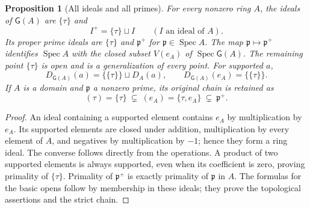 \documentclass[11pt,a4paper]{article}
\newtheorem{proposition}[theorem]{Proposition}
\theoremstyle{definition}\newtheorem{definition}[theorem]{Definition}
\newcommand{\Spec}{\operatorname{Spec}}\newcommand{\SpecMon}{\operatorname{Spec}_{\mathrm{mon}}}
\newcommand{\G}{\mathsf G}\newcommand{\Tor}{\operatorname{Tor}}\newcommand{\Frac}{\operatorname{Frac}}
\begin{document}
\begin{proposition}[All ideals and all primes]\label{prop:ideals}
For every nonzero ring $A$, the ideals of $\G(A)$ are $\{\tau\}$ and
\[
 I^+=\{\tau\}\sqcup I\qquad(I\text{ an ideal of }A).
 \tag{AV3.1}\label{eq:liftideal}
\]
Its proper prime ideals are $\{\tau\}$ and $\mathfrak p^+$ for
$\mathfrak p\in\Spec A$. The map
$\mathfrak p\mapsto\mathfrak p^+$ identifies $\Spec A$ with the closed
subset $V(e_A)$ of $\Spec\G(A)$. The remaining point $\{\tau\}$ is open
and is a generalization of every point. For supported $a$,
\[
 D_{\G(A)}(a)=\{\{\tau\}\}\sqcup D_A(a),\qquad
 D_{\G(A)}(e_A)=\{\{\tau\}\}.
 \tag{AV3.2}\label{eq:opens}
\]
If $A$ is a domain and $\mathfrak p$ a nonzero prime, its original chain
is retained as
\[
 (\tau)=\{\tau\}\ \subsetneq\ (e_A)=\{\tau,e_A\}
 \ \subsetneq\ \mathfrak p^+.
 \tag{AV3.3}\label{eq:chain}
\]
\end{proposition}
\begin{proof}
An ideal containing a supported element contains $e_A$ by multiplication
by $e_A$. Its supported elements are closed under addition, multiplication
by every element of $A$, and negatives by multiplication by $-1$; hence
they form a ring ideal. The converse follows directly from the operations.
A product of two supported elements is always supported, even when its
coefficient is zero, proving primality of $\{\tau\}$. Primality of
$\mathfrak p^+$ is exactly primality of $\mathfrak p$ in $A$.
The formulas for the basic opens follow by membership in these ideals;
they prove the topological assertions and the strict chain.
\end{proof}
\end{document}

